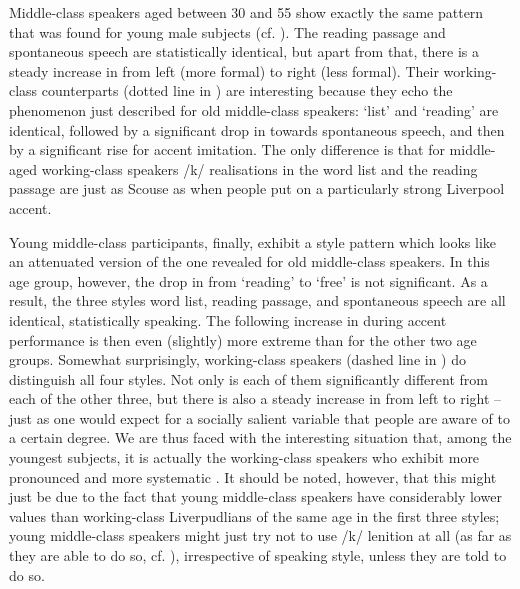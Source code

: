 Middle-class speakers aged between 30 and 55 show exactly the same  pattern that was found for young male subjects (cf. ).
The reading passage and spontaneous speech are statistically identical, but apart from that, there is a steady increase in  from left (more formal) to right (less formal).
Their working-class counterparts (dotted line in ) are interesting because they echo the phenomenon just described for old middle-class speakers: `list' and `reading' are identical, followed by a significant drop in  towards spontaneous speech, and then by a significant rise for accent imitation.
The only difference is that for middle-aged working-class speakers /k/ realisations in the word list and the reading passage are just as Scouse as when people put on a particularly strong Liverpool accent.

Young middle-class participants, finally, exhibit a style pattern which looks like an attenuated version of the one revealed for old middle-class speakers.
In this age group, however, the drop in  from `reading' to `free' is not significant.
As a result, the three styles word list, reading passage, and spontaneous speech are all identical, statistically speaking.
The following increase in  during accent performance is then even (slightly) more extreme than for the other two age groups.
Somewhat surprisingly, working-class speakers (dashed line in ) do distinguish all four styles.
Not only is each of them significantly different from each of the other three, but there is also a steady increase in  from left to right -- just as one would expect for a socially salient variable that people are aware of to a certain degree.
We are thus faced with the interesting situation that, among the youngest subjects, it is actually the working-class speakers who exhibit more pronounced and more systematic .
It should be noted, however, that this might just be due to the fact that young middle-class speakers have considerably lower  values than working-class Liverpudlians of the same age in the first three styles; young middle-class speakers might just try not to use /k/ lenition at all (as far as they are able to do so, cf. ), irrespective of speaking style, unless they are told to do so.